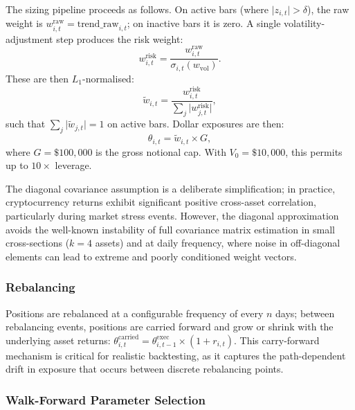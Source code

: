 \documentclass[11pt,a4paper]{article}
\newcommand{\abs}[1]{\lvert #1 \rvert}
\begin{document}
The sizing pipeline proceeds as follows.  On active bars (where $\abs{z_{i,t}} > \delta$), the raw weight is $w^{\text{raw}}_{i,t} = \text{trend\_raw}_{i,t}$; on inactive bars it is zero.  A single volatility-adjustment step produces the risk weight:
\begin{equation}
  w^{\text{risk}}_{i,t} = \frac{w^{\text{raw}}_{i,t}}{\sigma_{i,t}(w_{\text{vol}})}.
  \label{eq:risk-weight}
\end{equation}
These are then $L_1$-normalised:
\begin{equation}
  \tilde{w}_{i,t} = \frac{w^{\text{risk}}_{i,t}}{\sum_j \abs{w^{\text{risk}}_{j,t}}},
  \label{eq:vol-inv-weights}
\end{equation}
such that $\sum_j \abs{\tilde{w}_{j,t}} = 1$ on active bars.  Dollar exposures are then:
\begin{equation}
  \theta_{i,t} = \tilde{w}_{i,t} \times G,
  \label{eq:theta}
\end{equation}
where $G = \$100{,}000$ is the gross notional cap.  With $V_0 = \$10{,}000$, this permits up to $10\times$ leverage.

The diagonal covariance assumption is a deliberate simplification; in practice, cryptocurrency returns exhibit significant positive cross-asset correlation, particularly during market stress events.  However, the diagonal approximation avoids the well-known instability of full covariance matrix estimation in small cross-sections ($k = 4$ assets) and at daily frequency, where noise in off-diagonal elements can lead to extreme and poorly conditioned weight vectors.

\subsubsection{Rebalancing}

Positions are rebalanced at a configurable frequency of every $n$ days; between rebalancing events, positions are carried forward and grow or shrink with the underlying asset returns: $\theta^{\text{carried}}_{i,t} = \theta^{\text{exec}}_{i,t-1} \times (1 + r_{i,t})$.  This carry-forward mechanism is critical for realistic backtesting, as it captures the path-dependent drift in exposure that occurs between discrete rebalancing points.

\subsubsection{Walk-Forward Parameter Selection}
\label{sec:trend-wf}
\end{document}
